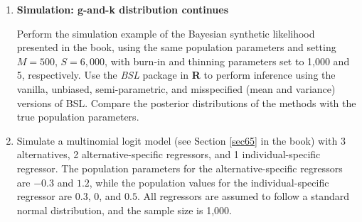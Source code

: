 \begin{enumerate}

	\item \textbf{Simulation: g-and-k distribution continues}
	
	Perform the simulation example of the Bayesian synthetic likelihood presented in the book, using the same population parameters and setting $M=500$, $S=6{,}000$, with burn-in and thinning parameters set to 1,000 and 5, respectively. Use the \textit{BSL} package in \textbf{R} to perform inference using the vanilla, unbiased, semi-parametric, and misspecified (mean and variance) versions of BSL. Compare the posterior distributions of the methods with the true population parameters. 

\item Simulate a multinomial logit model (see Section \ref{sec65} in the book) with 3 alternatives, 2 alternative-specific regressors, and 1 individual-specific regressor. The population parameters for the alternative-specific regressors are $-0.3$ and $1.2$, while the population values for the individual-specific regressor are $0.3$, $0$, and $0.5$. All regressors are assumed to follow a standard normal distribution, and the sample size is 1,000. 


\end{enumerate}
